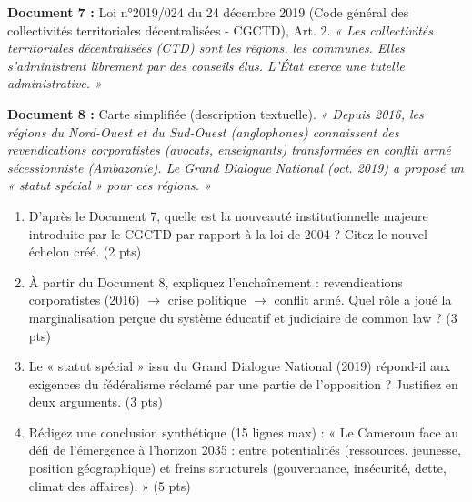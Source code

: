 \documentclass[11pt]{article}
\begin{document}
\begin{exercice}
\label{exo:actuel}
\textbf{Document 7 :} Loi n°2019/024 du 24 décembre 2019 (Code général des collectivités territoriales décentralisées - CGCTD), Art. 2. \textit{« Les collectivités territoriales décentralisées (CTD) sont les régions, les communes. Elles s'administrent librement par des conseils élus. L'État exerce une tutelle administrative. »}

\textbf{Document 8 :} Carte simplifiée (description textuelle). \textit{« Depuis 2016, les régions du Nord-Ouest et du Sud-Ouest (anglophones) connaissent des revendications corporatistes (avocats, enseignants) transformées en conflit armé sécessionniste (Ambazonie). Le Grand Dialogue National (oct. 2019) a proposé un « statut spécial » pour ces régions. »}

\begin{enumerate}
    \item D'après le Document 7, quelle est la nouveauté institutionnelle majeure introduite par le CGCTD par rapport à la loi de 2004 ? Citez le nouvel échelon créé. (2 pts)
    \item À partir du Document 8, expliquez l'enchaînement : revendications corporatistes (2016) $\to$ crise politique $\to$ conflit armé. Quel rôle a joué la marginalisation perçue du système éducatif et judiciaire de common law ? (3 pts)
    \item Le « statut spécial » issu du Grand Dialogue National (2019) répond-il aux exigences du fédéralisme réclamé par une partie de l'opposition ? Justifiez en deux arguments. (3 pts)
    \item Rédigez une conclusion synthétique (15 lignes max) : « Le Cameroun face au défi de l'émergence à l'horizon 2035 : entre potentialités (ressources, jeunesse, position géographique) et freins structurels (gouvernance, insécurité, dette, climat des affaires). » (5 pts)
\end{enumerate}
\end{exercice}
\end{document}

